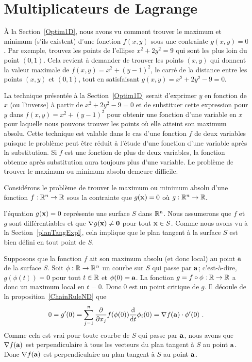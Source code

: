 {\section{Multiplicateurs de Lagrange \eng}

À la Section~\ref{Optim1D}, nous avons vu comment trouver le maximum et
minimum (s'ils existent) d'une fonction $f(x,y)$ sous une contrainte
$g(x,y) = 0$.  Par exemple, trouvez les points de l'ellipse
$x^2+ 2y^2=9$ qui sont les plus loin du point $(0,1)$.  Cela revient à
demander de trouver les points $(x,y)$ qui donnent la valeur maximale
de $f(x,y) = x^2 + (y-1)^2$, le carré de la distance entre les points
$(x,y)$ et $(0,1)$, tout en satisfaisant $g(x,y) = x^2 + 2 y^2 - 9 = 0$.

La technique présentée à la Section~\ref{Optim1D} serait d'exprimer $y$
en fonction de $x$ (ou l'inverse) à partir de $x^2 + 2 y^2 - 9 = 0$ et
de substituer cette expression pour $y$ dans $f(x,y) = x^2 + (y-1)^2$
pour obtenir une fonction d'une variable en $x$ pour laquelle nous
pouvons trouver les points où elle atteint son maximum absolu.
Cette technique est valable dans le cas d'une fonction $f$ de deux
variables puisque le problème peut être réduit à l'étude d'une fonction
d'une variable après la substitution.  Si $f$ est une fonction de plus
de deux variables, la fonction obtenue après substitution aura
toujours plus d'une variable.  Le problème de trouver le maximum ou
minimum absolu demeure difficile.

Considérons le problème de trouver le maximum ou minimum absolu d'une
fonction $f:\RR^n \to \RR$ sous la contrainte que $g(\VEC{x}) = 0$ où
$g:\RR^n \to \RR$.

l'équation $g(\VEC{x}) = 0$ représente une surface $S$ dans $\RR^n$.
Nous assumerons que $f$ et $g$ sont différentiables et que
$\nabla g(\VEC{x}) \neq \VEC{0}$ pour tout $\VEC{x} \in S$.   Comme
nous avons vu à la Section~\ref{planTangExpl}, cela implique que le plan
tangent à la surface $S$ est bien défini en tout point de $S$.

Supposons que la fonction $f$ ait son maximum absolu (et donc
local) au point $\VEC{a}$ de la surface $S$.  Soit $\phi:\RR \to \RR^n$
un courbe sur $S$ qui passe par $\VEC{a}$; c'est-à-dire,
$g(\phi(t)) = 0$ pour tout $t \in \RR$ et $\phi(0)= \VEC{a}$.
La fonction $g = f \circ \phi:\RR \to \RR$ a donc un maximum local en
$t=0$.  Donc $0$ est un point critique de $g$.  Il découle de la
proposition~\ref{ChainRuleND} que
\[
  0 = g'(0) = \sum_{j=1}^n \pdfdx{f}{x_j}(\phi(0)) \dfdx{\phi_i}{t}(0)
  = \nabla f(\VEC{a})\cdot \phi'(0) \ .
\]
Comme cela est vrai pour toute courbe de $S$ qui passe par $\VEC{a}$,
nous avons que $\nabla f(\VEC{a})$ est perpendiculaire à tous les vecteurs
du plan tangent à $S$ au point $\VEC{a}$.  Donc $\nabla f(\VEC{a})$
est perpendiculaire au plan tangent à $S$ au point $\VEC{a}$.

}
